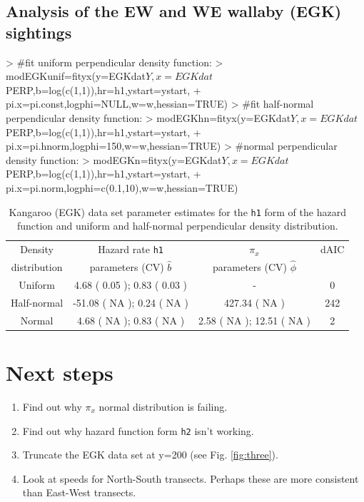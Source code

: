 \documentclass{article}
\begin{document}
\subsection{Analysis of the EW and WE wallaby (EGK) sightings}
\begin{Schunk}
\begin{Sinput}
> #fit uniform perpendicular density function:
> modEGKunif=fityx(y=EGKdat$Y,x=EGKdat$PERP,b=log(c(1,1)),hr=h1,ystart=ystart,
+                  pi.x=pi.const,logphi=NULL,w=w,hessian=TRUE)
> #fit half-normal perpendicular density function:
> modEGKhn=fityx(y=EGKdat$Y,x=EGKdat$PERP,b=log(c(1,1)),hr=h1,ystart=ystart,
+                  pi.x=pi.hnorm,logphi=150,w=w,hessian=TRUE)
> #normal perpendicular density function:
> modEGKn=fityx(y=EGKdat$Y,x=EGKdat$PERP,b=log(c(1,1)),hr=h1,ystart=ystart,
+                  pi.x=pi.norm,logphi=c(0.1,10),w=w,hessian=TRUE)
\end{Sinput}
\end{Schunk}
\begin{table}[h!]
\caption{Kangaroo (EGK) data set parameter estimates for the \texttt{h1} form of the hazard function and uniform and half-normal perpendicular density distribution.}\label{tab:two}
\begin{tabular} {c | c | c | c}
Density  & Hazard rate \texttt{h1}& $\pi_x$ & dAIC \\
distribution & parameters (CV) $\hat{b}$ & parameters (CV) $\hat{\phi}$ &  \\
\hline
Uniform & 4.68 ( 0.05 ); 0.83 ( 0.03 ) & - & 0\\
  
Half-normal & -51.08 ( NA ); 0.24 ( NA ) & 427.34 ( NA )
& 242\\
Normal & 4.68 ( NA ); 0.83 ( NA ) & 2.58 ( NA ); 12.51 ( NA )
& 2\\
\end{tabular}
\end{table}
\clearpage

\section{Next steps}
\begin{enumerate}
  \item Find out why $\pi_x$ normal distribution is failing.  
  \item Find out why hazard function form \texttt{h2} isn't working.
  \item Truncate the EGK data set at y=200 (see Fig. \ref{fig:three}).
  \item Look at speeds for North-South transects. Perhaps these are more consistent than East-West transects.
\end{enumerate}
\end{document}
